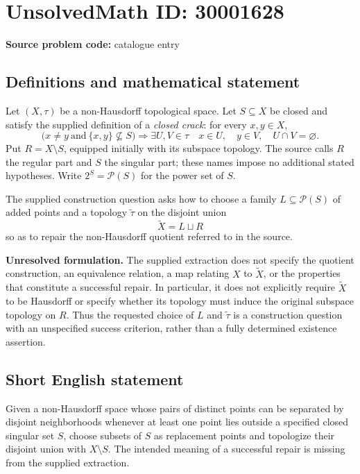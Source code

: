 \documentclass[11pt]{article}
\begin{document}
\section*{UnsolvedMath ID: 30001628}
\textbf{Source problem code:} catalogue entry
\subsection{Definitions and mathematical statement}
Let \((X,\tau)\) be a non-Hausdorff topological space. Let \(S\subseteq X\) be closed and satisfy the supplied definition of a \emph{closed crack}: for every \(x,y\in X\),
\[
\bigl(x\ne y\ \text{and}\ \{x,y\}\nsubseteq S\bigr)
\Longrightarrow
\exists U,V\in\tau\quad x\in U,\quad y\in V,\quad U\cap V=\varnothing.
\]
Put \(R=X\setminus S\), equipped initially with its subspace topology. The source calls \(R\) the regular part and \(S\) the singular part; these names impose no additional stated hypotheses. Write \(2^S=\mathcal P(S)\) for the power set of \(S\).

The supplied construction question asks how to choose a family \(L\subseteq\mathcal P(S)\) of added points and a topology \(\widetilde\tau\) on the disjoint union
\[
\widetilde X=L\sqcup R
\]
so as to repair the non-Hausdorff quotient referred to in the source.

\textbf{Unresolved formulation.} The supplied extraction does not specify the quotient construction, an equivalence relation, a map relating \(X\) to \(\widetilde X\), or the properties that constitute a successful repair. In particular, it does not explicitly require \(\widetilde X\) to be Hausdorff or specify whether its topology must induce the original subspace topology on \(R\). Thus the requested choice of \(L\) and \(\widetilde\tau\) is a construction question with an unspecified success criterion, rather than a fully determined existence assertion.
\subsection{Short English statement}
Given a non-Hausdorff space whose pairs of distinct points can be separated by disjoint neighborhoods whenever at least one point lies outside a specified closed singular set \(S\), choose subsets of \(S\) as replacement points and topologize their disjoint union with \(X\setminus S\). The intended meaning of a successful repair is missing from the supplied extraction.
\end{document}

